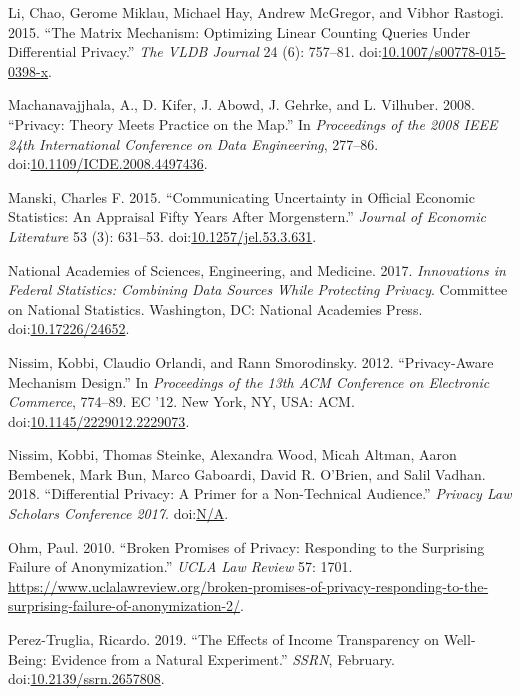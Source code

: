 \documentclass[]{article}
\begin{document}
\hypertarget{ref-li:matrix:VLDB:2015}{}
Li, Chao, Gerome Miklau, Michael Hay, Andrew McGregor, and Vibhor
Rastogi. 2015. ``The Matrix Mechanism: Optimizing Linear Counting
Queries Under Differential Privacy.'' \emph{The VLDB Journal} 24 (6):
757--81.
doi:\href{https://doi.org/10.1007/s00778-015-0398-x}{10.1007/s00778-015-0398-x}.

\hypertarget{ref-Machanavajjhala:OTM:ICDE:2008}{}
Machanavajjhala, A., D. Kifer, J. Abowd, J. Gehrke, and L. Vilhuber.
2008. ``Privacy: Theory Meets Practice on the Map.'' In
\emph{Proceedings of the 2008 IEEE 24th International Conference on Data
Engineering}, 277--86.
doi:\href{https://doi.org/10.1109/ICDE.2008.4497436}{10.1109/ICDE.2008.4497436}.

\hypertarget{ref-Manski2014}{}
Manski, Charles F. 2015. ``Communicating Uncertainty in Official
Economic Statistics: An Appraisal Fifty Years After Morgenstern.''
\emph{Journal of Economic Literature} 53 (3): 631--53.
doi:\href{https://doi.org/10.1257/jel.53.3.631}{10.1257/jel.53.3.631}.

\hypertarget{ref-groves:harris-kojetin:2017}{}
National Academies of Sciences, Engineering, and Medicine. 2017.
\emph{Innovations in Federal Statistics: Combining Data Sources While
Protecting Privacy}. Committee on National Statistics. Washington, DC:
National Academies Press.
doi:\href{https://doi.org/10.17226/24652}{10.17226/24652}.

\hypertarget{ref-Nissim:2012:PMD:2229012.2229073}{}
Nissim, Kobbi, Claudio Orlandi, and Rann Smorodinsky. 2012.
``Privacy-Aware Mechanism Design.'' In \emph{Proceedings of the 13th ACM
Conference on Electronic Commerce}, 774--89. EC '12. New York, NY, USA:
ACM.
doi:\href{https://doi.org/10.1145/2229012.2229073}{10.1145/2229012.2229073}.

\hypertarget{ref-Nissim:DPNonTech:WP:2018}{}
Nissim, Kobbi, Thomas Steinke, Alexandra Wood, Micah Altman, Aaron
Bembenek, Mark Bun, Marco Gaboardi, David R. O'Brien, and Salil Vadhan.
2018. ``Differential Privacy: A Primer for a Non-Technical Audience.''
\emph{Privacy Law Scholars Conference 2017}.
doi:\href{https://doi.org/N/A}{N/A}.

\hypertarget{ref-Ohm:Broken:UCLALR:2010}{}
Ohm, Paul. 2010. ``Broken Promises of Privacy: Responding to the
Surprising Failure of Anonymization.'' \emph{UCLA Law Review} 57: 1701.
\url{https://www.uclalawreview.org/broken-promises-of-privacy-responding-to-the-surprising-failure-of-anonymization-2/}.

\hypertarget{ref-perez-truglia:transparency:SSRN:2016}{}
Perez-Truglia, Ricardo. 2019. ``The Effects of Income Transparency on
Well-Being: Evidence from a Natural Experiment.'' \emph{SSRN}, February.
doi:\href{https://doi.org/10.2139/ssrn.2657808}{10.2139/ssrn.2657808}.
\end{document}
